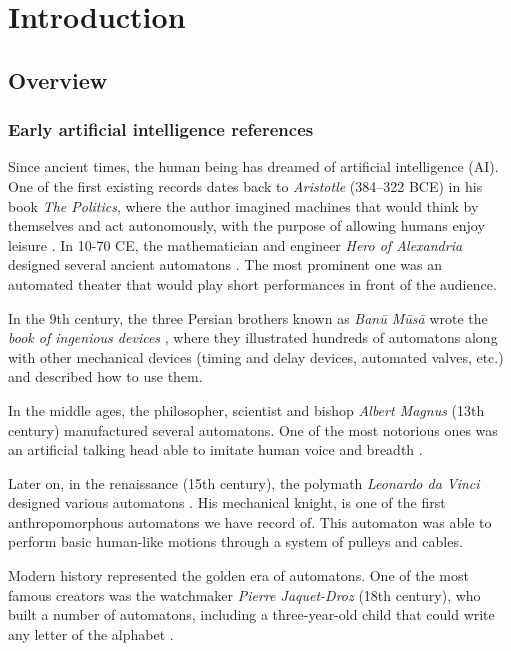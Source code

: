 
\chapter{Introduction} \label{ch:introduction}

\section{Overview}

\subsection{Early artificial intelligence references}

Since ancient times, the human being has dreamed of artificial intelligence (AI). One of the first existing records dates back to \textit{Aristotle} (384–322 BCE) in his book \textit{The Politics}, where the author imagined machines that would think by themselves and act autonomously, with the purpose of allowing humans enjoy leisure \autocite{nils2009}. In 10-70 CE, the mathematician and engineer \textit{Hero of Alexandria} designed several ancient automatons \autocite{greenwood1851}. The most prominent one was an automated theater that would play short performances in front of the audience.

In the 9th century, the three Persian brothers known as \textit{Banū Mūsā} wrote the \textit{book of ingenious devices} \autocite{musa1978}, where they illustrated hundreds of automatons along with other mechanical devices (timing and delay devices, automated valves, etc.) and described how to use them. 

In the middle ages, the philosopher, scientist and bishop \textit{Albert Magnus} (13th century) manufactured several automatons. One of the most notorious ones was an artificial talking head able to imitate human voice and breadth \autocite{worthies1828}.

Later on, in the renaissance (15th century), the polymath \textit{Leonardo da Vinci} designed various automatons \autocite{nils2009}. His mechanical knight, is one of the first anthropomorphous automatons we have record of. This automaton was able to perform basic human-like motions through a system of pulleys and cables. 

Modern history represented the golden era of automatons. One of the most famous creators was the watchmaker \textit{Pierre Jaquet-Droz} (18th century), who built a number of automatons, including a three-year-old child that could write any letter of the alphabet \autocite{carrera1979}.

